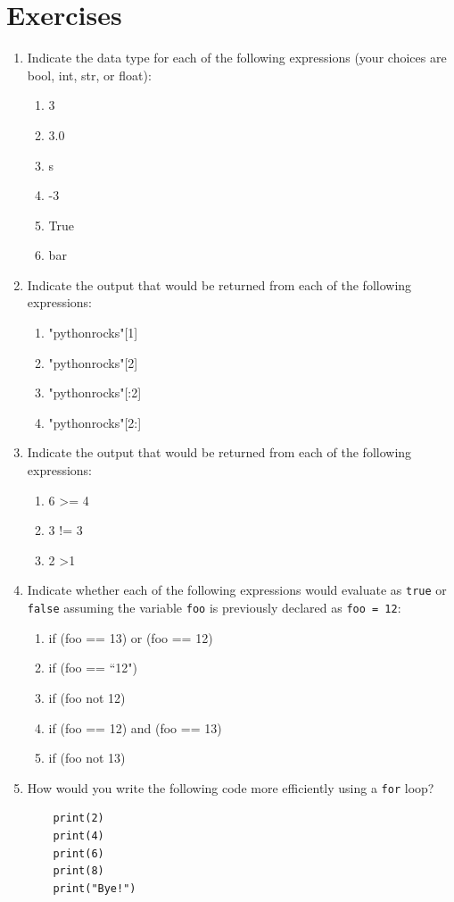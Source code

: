 \documentclass{book}
\begin{document}
\section{Exercises}
\begin{enumerate}
		\item Indicate the data type for each of the following expressions (your choices are bool, int, str, or float):
	\begin{enumerate}
		\item 3
		\item 3.0
		\item s
		\item -3
		\item True
		\item bar
	\end{enumerate}
	\item Indicate the output that would be returned from each of the following expressions:
	\begin{enumerate}
		\item "pythonrocks"[1]
		\item "pythonrocks"[2]
		\item "pythonrocks"[:2]
		\item "pythonrocks"[2:]
	\end{enumerate}
	\item Indicate the output that would be returned from each of the following expressions:
	\begin{enumerate}
		\item 6 \textgreater = 4
		\item 3 != 3
		\item 2 \textgreater 1
	\end{enumerate}
	\item Indicate whether each of the following expressions would evaluate as \texttt{true} or \texttt{false} assuming the variable \texttt{foo} is previously declared as \texttt{foo = 12}:
	\begin{enumerate}
		\item if (foo == 13) or (foo == 12)
		\item if (foo == ``12")
		\item if (foo not 12)
		\item if (foo == 12) and (foo == 13)
		\item if (foo not 13)
	\end{enumerate}
	\item How would you write the following code more efficiently using a \texttt{for} loop?
	\begin{lstlisting}
	print(2)
	print(4)
	print(6)
	print(8)
	print("Bye!")
	\end{lstlisting}
	

\end{enumerate}
\end{document}
